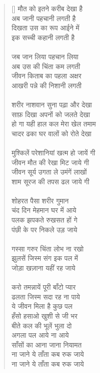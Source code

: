\begin{verse}[\versewidth]\texthindi{
मौत को इतने करीब देखा है\\
अब जानी पहचानी लगती है\\
दिखता उस का रूप आईने में\\
इक सच्ची कहानी लगती है\\
\\
जब जान लिया पहचान लिया\\
अब उस की चिंता कम लगती\\
जीवन किताब का पहला अक्षर\\
आखरी पन्ने की निशानी लगती\\
\\
शरीर नाशवान सुना पढ़ा और देखा\\
साफ़ दिखा अपनों को जलते देखा\\
हो गा यही हाल कल मेरा खेल तमाम\\
चादर ढका घर वालों को रोते देखा\\
\\
मुश्किलें परेशानियां खत्म हो जायें गी\\
जीवन मौत की रेखा मिट जाये गी\\
जीवन सूर्य उगता ले उमंगें लाखों\\
शाम सूरज की तपस ढल जाये गी\\
\\
शोहरत पैसा शरीर गुमान\\
चंद दिन मेहमान घर में आये\\
पलक झपकते रुखसत हों गे\\
पंछी के पर निकले उड़ जाये\\
\\
गस्सा गरुर चिंता लोभ ना रखो\\
झुलसें जिस्म संग इक पल में\\
जोड़ा खज़ाना यहीं रह जाये\\
\\
करो तमन्नायें पूरी बाँटो प्यार\\
ढलता जिस्म सदा रह ना पाये\\
ये जीवन मिला है कुछ पल\\
हँसो हसाओ खुशी से जी भर\\
बीते कल की भूलें भुला दो\\
अगला पल आये ना आये\\
साँसों का आना जाना नियामत\\
ना जाने ये ताँता कब रुक जाये\\
ना जाने ये ताँता कब रुक जाये
}\end{verse}

